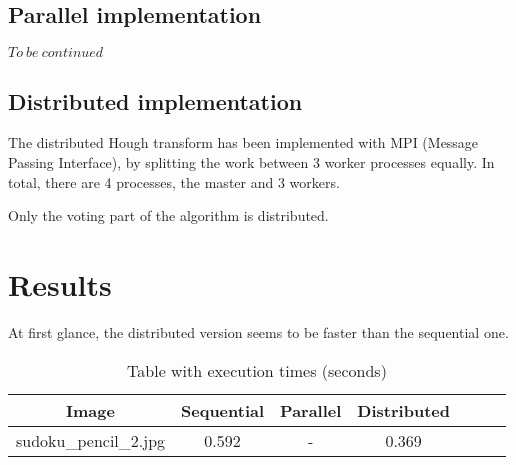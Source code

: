 \documentclass[journal, onecolumn, 12pt]{IEEEtran}
\begin{document}
\subsection{Parallel implementation}
$ To\ be\ continued $

\subsection{Distributed implementation}
The distributed Hough transform has been implemented with MPI (Message Passing Interface), by splitting the work between 3 worker processes equally. In total, there are 4 processes, the master and 3 workers. 

Only the voting part of the algorithm is distributed.


\section{Results}
At first glance, the distributed version seems to be faster than the sequential one.

\begin{table}[ht]
		\caption{Table with execution times (seconds)} 
\begin{tabular}{c c c c c c c} 
\hline\hline                        
		Image & Sequential & Parallel & Distributed &\\ [2ex]
\hline\hline                               
		sudoku\_pencil\_2.jpg & 0.592 & - & 0.369 \\       
\hline\hline                        
\end{tabular}
\end{table}
	


\vspace{12pt}
\end{document}
